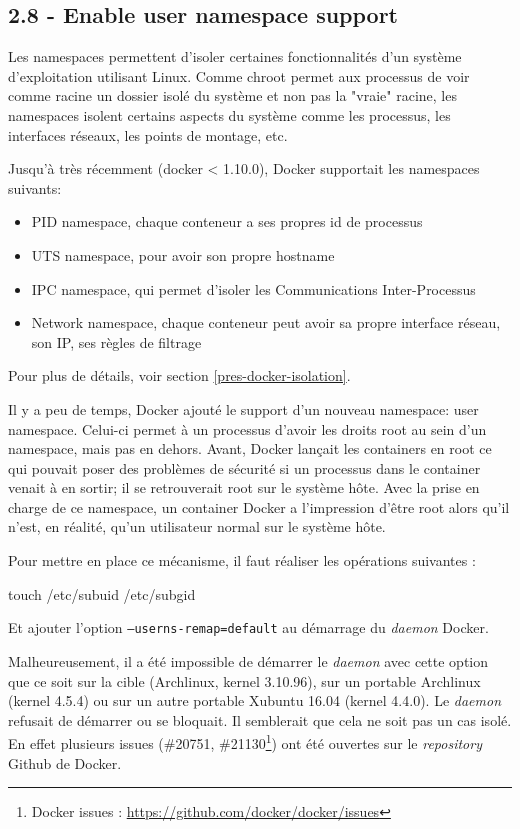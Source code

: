 \documentclass[11pt,a4paper,oneside]{report}
\newcommand{\code}[1]{\texttt{#1}}
\begin{document}
\subsection{2.8 - Enable user namespace support}
Les namespaces permettent d'isoler certaines fonctionnalités d'un système d'exploitation utilisant Linux. Comme chroot permet aux processus de voir comme racine un dossier isolé du système et non pas la "vraie" racine, les namespaces isolent certains aspects du système comme les processus, les interfaces réseaux, les points de montage, etc.

Jusqu'à très récemment (docker < 1.10.0), Docker supportait les namespaces suivants:
\begin{itemize}
\item PID namespace, chaque conteneur a ses propres id de processus
\item UTS namespace, pour avoir son propre hostname
\item IPC namespace, qui permet d'isoler les Communications Inter-Processus
\item Network namespace, chaque conteneur peut avoir sa propre interface réseau, son IP, ses règles de filtrage
\end{itemize}

Pour plus de détails, voir section \ref{pres-docker-isolation}.

Il y a peu de temps, Docker ajouté le support d'un nouveau namespace\cite{docker_1_10_user_namespace}: user namespace. Celui-ci permet à un processus d'avoir les droits root au sein d'un namespace, mais pas en dehors. Avant, Docker lançait les containers en root ce qui pouvait poser des problèmes de sécurité si un processus dans le container venait à en sortir; il se retrouverait root sur le système hôte. Avec la prise en charge de ce namespace, un container Docker a l'impression d'être root alors qu'il n'est, en réalité, qu'un utilisateur normal sur le système hôte.

Pour mettre en place ce mécanisme, il faut réaliser les opérations suivantes :

\begin{bashcode}
touch /etc/subuid /etc/subgid
\end{bashcode}

Et ajouter l'option \code{--userns-remap=default} au démarrage du \textit{daemon} Docker.

Malheureusement, il a été impossible de démarrer le \textit{daemon} avec cette option que ce soit sur la cible (Archlinux, kernel 3.10.96), sur un portable Archlinux (kernel 4.5.4) ou sur un autre portable Xubuntu 16.04 (kernel 4.4.0). Le \textit{daemon} refusait de démarrer ou se bloquait. Il semblerait que cela ne soit pas un cas isolé. En effet plusieurs issues (\#20751, \#21130\footnote{Docker issues : \url{https://github.com/docker/docker/issues}}) ont été ouvertes sur le \textit{repository} Github de Docker.
\end{document}
